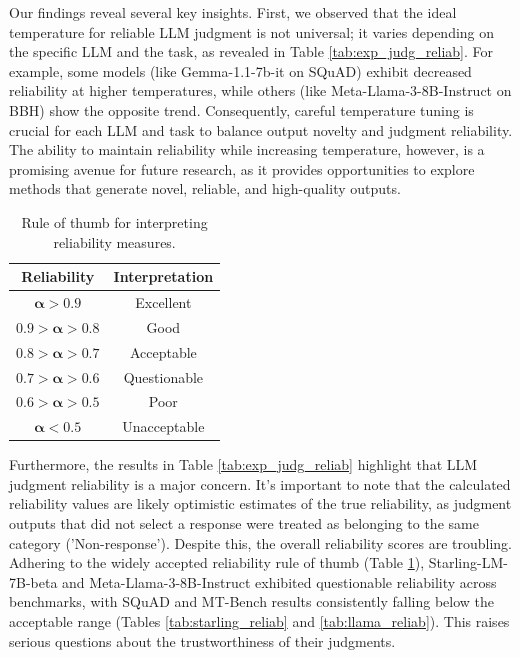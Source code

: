 \documentclass[11pt]{article}
\begin{document}
Our findings reveal several key insights. First, we observed that the ideal temperature for reliable LLM judgment is not universal; it varies depending on the specific LLM and the task, as revealed in Table \ref{tab:exp_judg_reliab}. For example, some models (like Gemma-1.1-7b-it on SQuAD) exhibit decreased reliability at higher temperatures, while others (like Meta-Llama-3-8B-Instruct on BBH) show the opposite trend. Consequently, careful temperature tuning is crucial for each LLM and task to balance output novelty and judgment reliability. The ability to maintain reliability while increasing temperature, however, is a promising avenue for future research, as it provides opportunities to explore methods that generate novel, reliable, and high-quality outputs.


\begin{table}[!th]
 \centering
\begin{tabular}{cc}
    \textbf{Reliability} & \textbf{Interpretation} \\
   \hline
    $\mathbf{\boldsymbol{\alpha} \boldsymbol{>} 0.9}$ & Excellent\\
    $\mathbf{0.9 > \boldsymbol{\alpha} > 0.8}$ & Good \\
    $\mathbf{0.8 > \boldsymbol{\alpha} > 0.7}$ & Acceptable \\
    $\mathbf{0.7 > \boldsymbol{\alpha} > 0.6}$ & Questionable \\
    $\mathbf{0.6 > \boldsymbol{\alpha} > 0.5}$ & Poor \\
    $\boldsymbol{\alpha} \mathbf{< 0.5}$ & Unacceptable \\
    \hline
\end{tabular}
\caption{Rule of thumb for interpreting reliability measures.}
\label{tab:rule_thumb}
\end{table}



Furthermore, the results in Table \ref{tab:exp_judg_reliab} highlight that LLM judgment reliability is a major concern. It's important to note that the calculated reliability values are likely optimistic estimates of the true reliability, as judgment outputs that did not select a response were treated as belonging to the same category ('Non-response'). Despite this, the overall reliability scores are troubling. Adhering to the widely accepted reliability rule of thumb (Table \ref{tab:rule_thumb}), Starling-LM-7B-beta and Meta-Llama-3-8B-Instruct exhibited questionable reliability across benchmarks, with SQuAD and MT-Bench results consistently falling below the acceptable range (Tables \ref{tab:starling_reliab} and \ref{tab:llama_reliab}). This raises serious questions about the trustworthiness of their judgments.
\end{document}
